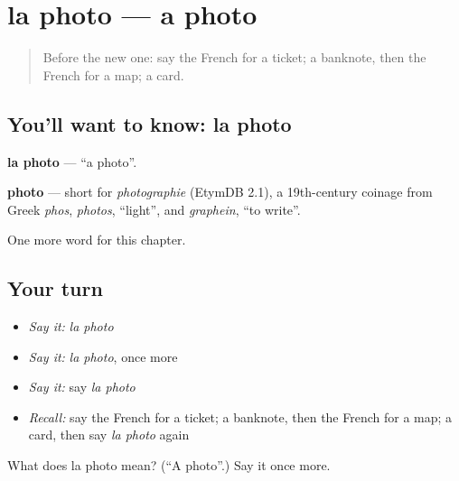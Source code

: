 \section[la photo]{la photo — a photo}

\label{lesson:FR-C80-photo}



\begin{quote}
Before the new one: say the French for a ticket; a banknote, then the French for a map; a card.
\end{quote}

\subsection*{You'll want to know: la photo}
\textbf{la photo} — \textquotedblleft{}a photo\textquotedblright{}.

\begin{cousinweb}
\textbf{photo} — short for \emph{photographie} (EtymDB 2.1), a 19th-century coinage from Greek \emph{phos}, \emph{photos}, \textquotedblleft{}light\textquotedblright{}, and \emph{graphein}, \textquotedblleft{}to write\textquotedblright{}.
\end{cousinweb}

\begin{grammarlens}[title={What you've built}]
One more word for this chapter.
\end{grammarlens}

\subsection*{Your turn}
\begin{itemize}
\raggedright
  \item \emph{Say it:} \emph{la photo}
  \item \emph{Say it:} \emph{la photo}, once more
  \item \emph{Say it:} say \emph{la photo}
  \item \emph{Recall:} say the French for a ticket; a banknote, then the French for a map; a card, then say \emph{la photo} again
\end{itemize}

\begin{tcolorbox}[breakable,colback=teal!4,colframe=teal!35!black,title={Before you move on}]
What does la photo mean? (\textquotedblleft{}A photo\textquotedblright{}.) Say it once more.
\end{tcolorbox}
